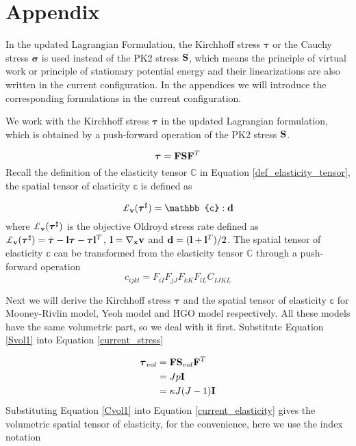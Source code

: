 \section{Appendix}
In the updated Lagrangian Formulation, the Kirchhoff stress $\boldsymbol{\tau}$ or the Cauchy stress $\boldsymbol{\sigma}$ is used instead of the PK2 stress $\bold{S}$, which means the principle of virtual work or principle of stationary potential energy and their linearizations are also written in the current configuration. In the appendices we will introduce the corresponding formulations in the current configuration.

%
We work with the Kirchhoff stress $\boldsymbol{\tau}$ in the updated Lagrangian formulation, which is obtained by a push-forward operation of the PK2 stress $\bold{S}$.

\begin{equation}
\boldsymbol{\tau} = \bold{F}\bold{S}{\bold{F}}^T \label{current_stress}
\end{equation}
Recall the definition of the elasticity tensor $\mathbb{C}$ in Equation \ref{def_elasticity_tensor}, the spatial tensor of elasticity $\mathbb{c}$ is defined as

\begin{equation}
\pounds_{\bold{v}}({\boldsymbol{\tau}}^{\sharp}) = \mathbb{c} : \bold{d}
\end{equation} 
where $\pounds_{\bold{v}}({\boldsymbol{\tau}}^{\sharp})$ is the objective Oldroyd stress rate defined as $\pounds_{\bold{v}}({\boldsymbol{\tau}}^{\sharp}) = \dot{\boldsymbol{\tau}} - \bold{l}\boldsymbol{\tau} - \boldsymbol{\tau}\bold{l}^T$, $\bold{l} = \nabla_{\bold{x}}\bold{v}$ and $\bold{d} = (\bold{l} + {\bold{l}}^T)/2$. 
The spatial tensor of elasticity $\mathbb{c}$ can be transformed from the elasticity tensor $\mathbb{C}$ through a push-forward operation
\begin{equation}
c_{ijkl} = F_{iI}F_{jJ}F_{kK}F_{lL}C_{IJKL} \label{current_elasticity}
\end{equation}

Next we will derive the Kirchhoff stress $\boldsymbol{\tau}$ and the spatial tensor of elasticity $\mathbb{c}$ for Mooney-Rivlin model, Yeoh model and HGO model respectively. All these models have the same volumetric part, so we deal with it first. Substitute Equation \ref{Svol1} into Equation \ref{current_stress}

\begin{subequations}
\label{Tauvol1}
\begin{align}
\boldsymbol{\tau}_{vol} &= \bold{F}\bold{S}_{vol}{\bold{F}}^T \\
				    &= Jp\bold{I} \label{Tauvol11}\\
		      		    &= \kappa J(J-1) \bold{I} \label{Tauvol12}
\end{align}
\end{subequations}
Substituting Equation \ref{Cvol1} into Equation \ref{current_elasticity} gives the volumetric spatial tensor of elasticity, for the convenience, here we use the index notation

